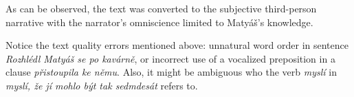 As can be observed, the text was converted to the subjective third-person narrative with the narrator's omniscience limited to Matyáš's knowledge.

Notice the text quality errors mentioned above: unnatural word order in sentence \emph{Rozhlédl Matyáš se po kavárně}, or incorrect use of a vocalized preposition in a clause \emph{přistoupila ke němu}. Also, it might be ambiguous who the verb \emph{myslí} in \emph{myslí, že jí mohlo být tak sedmdesát} refers to.
